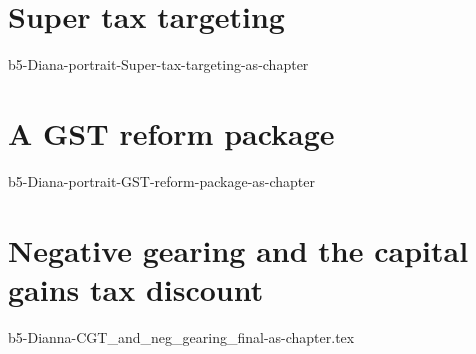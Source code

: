 \documentclass[twoside,english]{Dianab5ona4portrait}
\begin{document}
\part{Super tax targeting}\label{part:SUPER}
{b5-Diana-portrait-Super-tax-targeting-as-chapter}

\part{A GST reform package}\label{part:GST}
{b5-Diana-portrait-GST-reform-package-as-chapter}

\part{Negative gearing and the capital gains tax discount}
{b5-Dianna-CGT_and_neg_gearing_final-as-chapter.tex}





\backmatter
{}
\clearpage
\listoffigures
\printfigurenotes
\cleardoublepage
\listoftables
\printtablenotes
\cleardoublepage

\printendnotes
{}
\printbibliography[title={Bibliography},heading=none]
\end{document}
